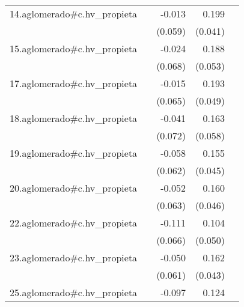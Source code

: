 {\begin{longtable}{l*{4}{D{.}{.}{-1}}}
\addlinespace
14.aglomerado#c.hv\_propieta&                     &      -0.013         &       0.199\sym{***}&                     \\
            &                     &     (0.059)         &     (0.041)         &                     \\
\addlinespace
15.aglomerado#c.hv\_propieta&                     &      -0.024         &       0.188\sym{***}&                     \\
            &                     &     (0.068)         &     (0.053)         &                     \\
\addlinespace
17.aglomerado#c.hv\_propieta&                     &      -0.015         &       0.193\sym{***}&                     \\
            &                     &     (0.065)         &     (0.049)         &                     \\
\addlinespace
18.aglomerado#c.hv\_propieta&                     &      -0.041         &       0.163\sym{**} &                     \\
            &                     &     (0.072)         &     (0.058)         &                     \\
\addlinespace
19.aglomerado#c.hv\_propieta&                     &      -0.058         &       0.155\sym{***}&                     \\
            &                     &     (0.062)         &     (0.045)         &                     \\
\addlinespace
20.aglomerado#c.hv\_propieta&                     &      -0.052         &       0.160\sym{***}&                     \\
            &                     &     (0.063)         &     (0.046)         &                     \\
\addlinespace
22.aglomerado#c.hv\_propieta&                     &      -0.111         &       0.104\sym{*}  &                     \\
            &                     &     (0.066)         &     (0.050)         &                     \\
\addlinespace
23.aglomerado#c.hv\_propieta&                     &      -0.050         &       0.162\sym{***}&                     \\
            &                     &     (0.061)         &     (0.043)         &                     \\
\addlinespace
25.aglomerado#c.hv\_propieta&                     &      -0.097         &       0.124\sym{*}  &                     \\

\end{longtable}}
